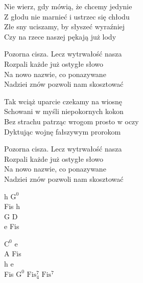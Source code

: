 \begin{textn}
    Nie wierz, gdy mówią, że chcemy jedynie\\
    Z głodu nie marnieć i ustrzec się chłodu\\
    Złe sny uciszamy, by słyszeć wyraźniej\\
    Czy na rzece naszej pękają już lody

    Pozorna cisza. Lecz wytrwałość nasza\\
    Rozpali każde już ostygłe słowo\\
    Na nowo nazwie, co ponazywane\\
    Nadziei znów pozwoli nam skosztować

    Tak wciąż uparcie czekamy na wiosnę\\
    Schowani w myśli niepokornych kokon\\
    Bez strachu patrząc wrogom prosto w oczy\\
    Dyktując wojnę fałszywym prorokom

    Pozorna cisza. Lecz wytrwałość nasza\\
    Rozpali każde już ostygłe słowo\\
    Na nowo nazwie, co ponazywane\\
    Nadziei znów pozwoli nam skosztować
\end{textn}
\begin{chordw}
    h $\mathrm{G^{0}}$\\
    Fis h\\
    G D\\
    e Fis

    $\mathrm{C^{0}}$ e\\
    A Fis\\
    h e\\
    Fis $\mathrm{G^{0}}$ $\mathrm{Fis_{4}^{7}}$ $\mathrm{Fis^{7}}$
\end{chordw}

